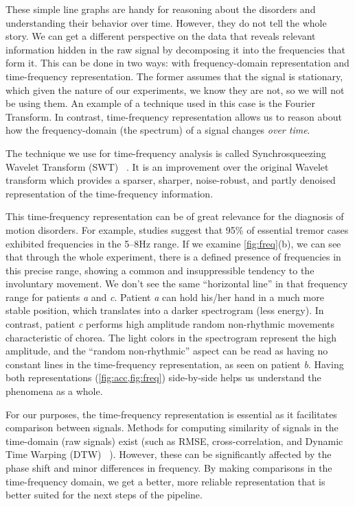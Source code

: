 These simple line graphs are handy for reasoning about the disorders and understanding their behavior over time. However, they do not tell the whole story. We can get a different perspective on the data that reveals relevant information hidden in the raw signal by decomposing it into the frequencies that form it. This can be done in two ways: with frequency-domain representation and time-frequency representation. The former assumes that the signal is stationary, which given the nature of our experiments, we know they are not, so we will not be using them. An example of a technique used in this case is the Fourier Transform. In contrast, time-frequency representation allows us to reason about how the frequency-domain (the spectrum) of a signal changes \textit{over time}.

The technique we use for time-frequency analysis is called Synchrosqueezing Wavelet Transform (SWT)~ \cite{MIHALEC2016324}. It is an improvement over the original Wavelet transform  which provides a sparser, sharper, noise-robust, and partly denoised representation of the time-frequency information. 

This time-frequency representation can be of great relevance for the diagnosis of motion disorders. For example, studies suggest that 95\% of essential tremor cases exhibited frequencies in the 5--8Hz range. If we examine \cref{fig:freq}(b), we can see that through the whole experiment, there is a defined presence of frequencies in this precise range, showing a common and insuppressible tendency to the involuntary movement. We don't see the same ``horizontal line'' in that frequency range for patients \textit{a} and \textit{c}. Patient \textit{a} can hold his/her hand in a much more stable position, which translates into a darker spectrogram (less energy). In contrast, patient \textit{c} performs high amplitude random non-rhythmic movements characteristic of chorea. The light colors in the spectrogram represent the high amplitude, and the ``random non-rhythmic'' aspect can be read as having no constant lines in the time-frequency representation, as seen on patient \textit{b}. Having both representations (\cref{fig:acc,fig:freq}) side-by-side helps us understand the phenomena as a whole. 

For our purposes, the time-frequency representation is essential as it facilitates comparison between signals. Methods for computing similarity of signals in the time-domain (raw signals) exist (such as RMSE, cross-correlation, and Dynamic Time Warping (DTW)~\cite{Gupta1996} ). However, these can be significantly affected by the phase shift and minor differences in frequency. By making comparisons in the time-frequency domain, we get a better, more reliable representation that is better suited for the next steps of the pipeline.

